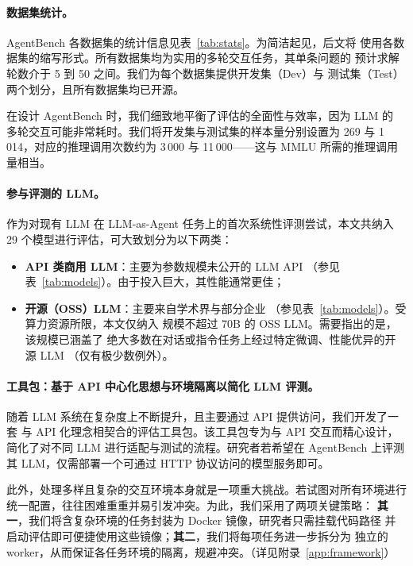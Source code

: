\paragraph{数据集统计。}
AgentBench 各数据集的统计信息见表~\ref{tab:stats}。为简洁起见，后文将
使用各数据集的缩写形式。所有数据集均为实用的多轮交互任务，其单条问题的
预计求解轮数介于 5 到 50 之间。我们为每个数据集提供开发集（Dev）与
测试集（Test）两个划分，且所有数据集均已开源。

在设计 AgentBench 时，我们细致地平衡了评估的全面性与效率，因为 LLM 的
多轮交互可能非常耗时。我们将开发集与测试集的样本量分别设置为 269 与
1\,014，对应的推理调用次数约为 3\,000 与 11\,000——这与 MMLU
\citep{hendrycks2021b} 所需的推理调用量相当。

\paragraph{参与评测的 LLM。}
作为对现有 LLM 在 LLM-as-Agent 任务上的首次系统性评测尝试，本文共纳入
29 个模型进行评估，可大致划分为以下两类：
\begin{itemize}
    \item \textbf{API 类商用 LLM}：主要为参数规模未公开的 LLM API
          （参见表~\ref{tab:models}）。由于投入巨大，其性能通常更佳；
    \item \textbf{开源（OSS）LLM}：主要来自学术界与部分企业
          （参见表~\ref{tab:models}）。受算力资源所限，本文仅纳入
          规模不超过 70B 的 OSS LLM。需要指出的是，该规模已涵盖了
          绝大多数在对话或指令任务上经过特定微调、性能优异的开源 LLM
          （仅有极少数例外）。
\end{itemize}

\paragraph{工具包：基于 API 中心化思想与环境隔离以简化 LLM 评测。}
随着 LLM 系统在复杂度上不断提升，且主要通过 API 提供访问，我们开发了一套
与 API 化理念相契合的评估工具包。该工具包专为与 API 交互而精心设计，
简化了对不同 LLM 进行适配与测试的流程。研究者若希望在 AgentBench 上评测
其 LLM，仅需部署一个可通过 HTTP 协议访问的模型服务即可。

此外，处理多样且复杂的交互环境本身就是一项重大挑战。若试图对所有环境进行
统一配置，往往困难重重并易引发冲突。为此，我们采用了两项关键策略：
\textbf{其一}，我们将含复杂环境的任务封装为 Docker 镜像，研究者只需挂载代码路径
并启动评估即可便捷使用这些镜像；\textbf{其二}，我们将每项任务进一步拆分为
独立的 worker，从而保证各任务环境的隔离，规避冲突。（详见附录~\ref{app:framework}）

